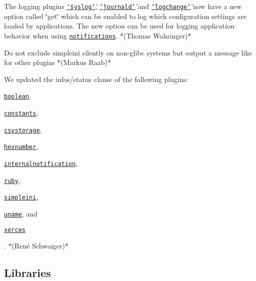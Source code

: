 \begin{DoxyItemize}
\item The logging plugins \href{https://www.libelektra.org/plugins/syslog}{\tt \char`\"{}syslog\char`\"{}}, \href{https://www.libelektra.org/plugins/journald}{\tt \char`\"{}journald\char`\"{}} and \href{https://www.libelektra.org/plugins/logchange}{\tt \char`\"{}logchange\char`\"{}} now have a new option called \char`\"{}get\char`\"{} which can be enabled to log which configuration settings are loaded by applications. The new option can be used for logging application behavior when using \href{https://www.libelektra.org/tutorials/notifications}{\tt notifications}. $\ast$(Thomas Wahringer)$\ast$
\item Do not exclude {\ttfamily simpleini} silently on non-\/glibc systems but output a message like for other plugins $\ast$(Markus Raab)$\ast$
\item We updated the {\ttfamily infos/status} clause of the following plugins\+:
\begin{DoxyItemize}
\item \href{http://libelektra.org/plugins/boolean}{\tt {\ttfamily boolean}},
\item \href{http://libelektra.org/plugins/constants}{\tt {\ttfamily constants}},
\item \href{http://libelektra.org/plugins/csvstorage}{\tt {\ttfamily csvstorage}},
\item \href{http://libelektra.org/plugins/hexnumber}{\tt {\ttfamily hexnumber}},
\item \href{http://libelektra.org/plugins/internalnotification}{\tt {\ttfamily internalnotification}},
\item \href{http://libelektra.org/plugins/ruby}{\tt {\ttfamily ruby}},
\item \href{http://libelektra.org/plugins/simpleini}{\tt {\ttfamily simpleini}},
\item \href{http://libelektra.org/plugins/uname}{\tt {\ttfamily uname}}, and
\item \href{http://libelektra.org/plugins/xerces}{\tt {\ttfamily xerces}}
\end{DoxyItemize}

. $\ast$(René Schwaiger)$\ast$
\end{DoxyItemize}

\subsection*{Libraries}

